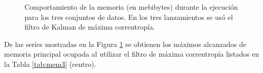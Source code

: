 \begin{figure}[h!]
\centering
{}\hfill
{}\vfill
{}
\caption{Comportamiento de la memoria (en mebibytes) durante la ejecuci\'on para los tres conjuntos de datos. En los tres lanzamientos se us\'o el filtro de Kalman de m\'axima correntrop\'ia.}
\label{fig:mem_new_mcc}
\end{figure}

De las series mostradas en la Figura \ref{fig:mem_new_mcc} se obtienen los m\'aximos alcanzados de memoria principal ocupada al utilizar el filtro de m\'axima correntrop\'ia listados en la Tabla \ref{tab:mem3} (centro). 
\bigskip


